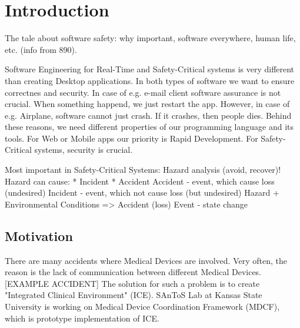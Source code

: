 
\cleardoublepage


\chapter{Introduction}
\label{introduction}

The tale about software safety: why important, software everywhere, human life, etc. (info from 890).

Software Engineering for Real-Time and Safety-Critical systems is very different than creating Desktop applications. In both types of software we want to ensure correctnes and security. In case of e.g. e-mail client software assurance is not crucial. When something happend, we just restart the app. However, in case of e.g. Airplane, software cannot just crash. If it crashes, then people dies. Behind these reasons, we need different properties of our programming language and its tools. For Web or Mobile apps our priority is Rapid Development. For Safety-Critical systems, security is crucial.


Most important in Safety-Critical Systems: Hazard analysis (avoid, recover)!
Hazard can cause:
	* Incident
	* Accident
Accident - event, which cause loss (undesired)
Incident - event, which not cause loss (but undesired)
Hazard + Environmental Conditions => Accident (loss)
Event - state change

\section{Motivation}
\label{introduction:motivation}
There are many accidents where Medical Devices are involved. Very often, the reason is the lack of communication between different Medical Devices. [EXAMPLE ACCIDENT]
The solution for such a problem is to create "Integrated Clinical Environment" (ICE). SAnToS Lab at Kansas State University is working on Medical Device Coordination Framework (MDCF), which is prototype implementation of ICE.  

